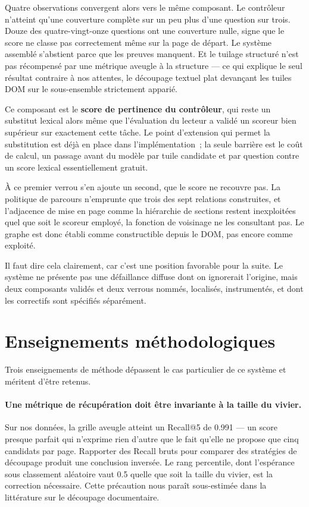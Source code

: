 Quatre observations convergent alors vers le même composant. Le contrôleur
n'atteint qu'une couverture complète sur un peu plus d'une question sur trois.
Douze des quatre-vingt-onze questions ont une couverture nulle, signe que le
score ne classe pas correctement même sur la page de départ. Le système assemblé
s'abstient parce que les preuves manquent. Et le tuilage structuré n'est pas
récompensé par une métrique aveugle à la structure --- ce qui explique le seul
résultat contraire à nos attentes, le découpage textuel plat devançant les tuiles
DOM sur le sous-ensemble strictement apparié.

Ce composant est le \textbf{score de pertinence du contrôleur}, qui reste un
substitut lexical alors même que l'évaluation du lecteur a validé un scoreur bien
supérieur sur exactement cette tâche. Le point d'extension qui permet la
substitution est déjà en place dans l'implémentation~; la seule barrière est le
coût de calcul, un passage avant du modèle par tuile candidate et par question
contre un score lexical essentiellement gratuit.

À ce premier verrou s'en ajoute un second, que le score ne recouvre pas. La
politique de parcours n'emprunte que trois des sept relations construites, et
l'adjacence de mise en page comme la hiérarchie de sections restent
inexploitées quel que soit le scoreur employé, la fonction de voisinage ne les
consultant pas. Le graphe est donc établi comme constructible depuis le DOM,
pas encore comme exploité.

Il faut dire cela clairement, car c'est une position favorable pour la suite. Le
système ne présente pas une défaillance diffuse dont on ignorerait l'origine,
mais deux composants validés et deux verrous nommés, localisés, instrumentés, et
dont les correctifs sont spécifiés séparément.

\section*{Enseignements méthodologiques}

Trois enseignements de méthode dépassent le cas particulier de ce système et
méritent d'être retenus.

\paragraph{Une métrique de récupération doit être invariante à la taille du
vivier.} Sur nos données, la grille aveugle atteint un Recall@5 de \num{0.991}
--- un score presque parfait qui n'exprime rien d'autre que le fait qu'elle ne
propose que cinq candidats par page. Rapporter des Recall bruts pour comparer des
stratégies de découpage produit une conclusion inversée. Le rang percentile, dont
l'espérance sous classement aléatoire vaut \num{0.5} quelle que soit la taille du
vivier, est la correction nécessaire. Cette précaution nous paraît sous-estimée
dans la littérature sur le découpage documentaire.

